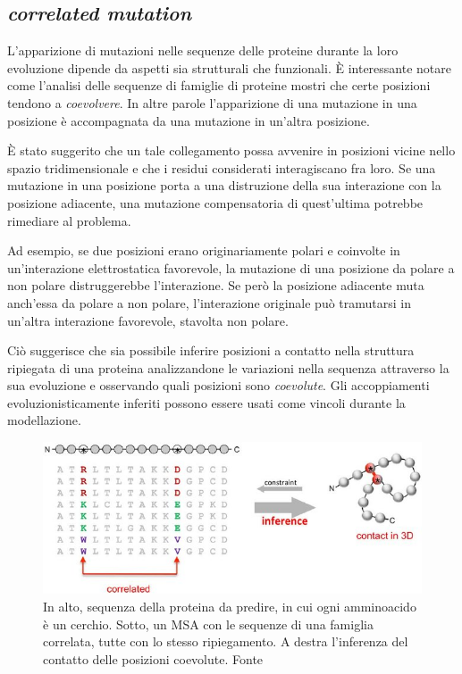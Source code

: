 \subsection{\textit{correlated mutation}}
{
	L'apparizione di mutazioni nelle sequenze delle proteine durante la loro evoluzione dipende da aspetti sia strutturali che funzionali. È interessante notare come l'analisi delle sequenze di famiglie di proteine mostri che certe posizioni tendono a \textit{coevolvere}. In altre parole l'apparizione di una mutazione in una posizione è accompagnata da una mutazione in un'altra posizione. 
	
	\par È stato suggerito che un tale collegamento possa avvenire in posizioni vicine nello spazio tridimensionale e che i residui considerati interagiscano fra loro. Se una mutazione in una posizione porta a una distruzione della sua interazione con la posizione adiacente, una mutazione compensatoria di quest'ultima potrebbe rimediare al problema.
	
	\par Ad esempio, se due posizioni erano originariamente polari e coinvolte in un'interazione elettrostatica favorevole, la mutazione di una posizione da polare a non polare distruggerebbe l'interazione. Se però la posizione adiacente muta anch'essa da polare a non polare, l'interazione originale può tramutarsi in un'altra interazione favorevole, stavolta non polare.
	
	\par Ciò suggerisce che sia possibile inferire posizioni a contatto nella struttura ripiegata di una proteina analizzandone le variazioni nella sequenza attraverso la sua evoluzione e osservando quali posizioni sono \textit{coevolute}. Gli accoppiamenti evoluzionisticamente inferiti possono essere usati come vincoli durante la modellazione.
	
	\begin{figure}[!htb]
		\centering
		\includegraphics[scale=0.65]{images/correlated-mutation.jpg}
		\caption{In alto, sequenza della proteina da predire, in cui ogni amminoacido è un cerchio. Sotto, un MSA con le sequenze di una famiglia correlata, tutte con lo stesso ripiegamento. A destra l'inferenza del contatto delle posizioni coevolute. Fonte\cite{marks2011protein}}
		\label{fig:correlated-mutation}
	\end{figure}
	
}
